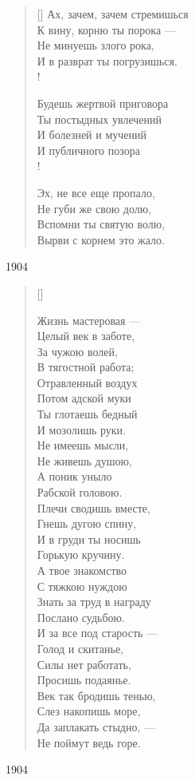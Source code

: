 \settowidth{\versewidth}{Ах, зачем, зачем стремишься}
\begin{verse}[\versewidth]
Ах, зачем, зачем стремишься\\
К вину, корню ты порока ---\\
Не минуешь злого рока,\\
И в разврат ты погрузишься.\\!

Будешь жертвой приговора\\
Ты постыдных увлечений\\
И болезней и мучений\\
И публичного позора\\!

Эх, не все еще пропало,\\
Не губи же свою долю,\\
Вспомни ты святую волю,\\
Вырви с корнем это жало.
\end{verse}
1904


\settowidth{\versewidth}{Целый век в заботе}
\begin{verse}[\versewidth]
\begin{altverse}
Жизнь мастеровая ---\\
Целый век в заботе,\\
За чужою волей,\\
В тягостной работа;\\
Отравленный воздух\\
Потом адской муки\\
Ты глотаешь бедный\\
И мозолишь руки.\\
Не имеешь мысли,\\
Не живешь душою,\\
А поник уныло\\
Рабской головою.\\
Плечи сводишь вместе,\\
Гнешь дугою спину,\\
И в груди ты носишь\\
Горькую кручину.\\
А твое знакомство\\
С тяжкою нуждою\\
Знать за труд в награду\\
Послано судьбою.\\
И за все под старость ---\\
Голод и скитанье,\\
Силы нет работать,\\
Просишь подаянье.\\
Век так бродишь тенью,\\
Слез накопишь море,\\
Да заплакать стыдно, ---\\
Не поймут ведь горе.
\end{altverse}
\end{verse}
1904



